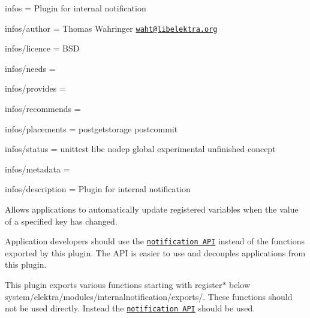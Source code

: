 
\begin{DoxyItemize}
\item infos = Plugin for internal notification
\item infos/author = Thomas Wahringer \href{mailto:waht@libelektra.org}{\tt waht@libelektra.\+org}
\item infos/licence = B\+SD
\item infos/needs =
\item infos/provides =
\item infos/recommends =
\item infos/placements = postgetstorage postcommit
\item infos/status = unittest libc nodep global experimental unfinished concept
\item infos/metadata =
\item infos/description = Plugin for internal notification
\end{DoxyItemize}

Allows applications to automatically update registered variables when the value of a specified key has changed.

Application developers should use the \href{https://doc.libelektra.org/api/current/html/group__kdbnotification.html}{\tt notification A\+PI} instead of the functions exported by this plugin. The A\+PI is easier to use and decouples applications from this plugin.

This plugin exports various functions starting with {\ttfamily register$\ast$} below {\ttfamily system/elektra/modules/internalnotification/exports/}. These functions should not be used directly. Instead the \href{https://doc.libelektra.org/api/current/html/group__kdbnotification.html}{\tt notification A\+PI} should be used. 